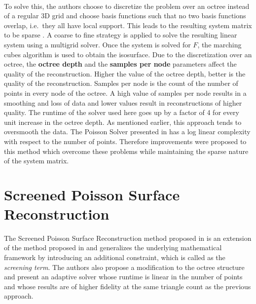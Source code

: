 \documentclass[12pt,a4paper]{article}
\begin{document}
\paragraph{}
To solve this, the authors choose to discretize the problem over an octree instead of a regular 3D grid and choose basis functions such that no two basis functions overlap, i.e.\ they all have local support. This leads to  the resulting system matrix to be sparse \cite{DBLP:journals/bioinformatics/KimVMSYLFMKRKHFT14}. A coarse to fine strategy is applied to solve the resulting linear system using a multigrid solver. Once the system is solved for $F$, the marching cubes algorithm \cite{MC} is used to obtain the isosurface. Due to the discretization over an octree, the \textbf{octree depth} and the \textbf{samples per node} parameters affect the quality of the reconstruction. Higher the value of the octree depth, better is the quality of the reconstruction. Samples per node is the count of the number of points in every node of the octree. A high value of samples per node results in a smoothing and loss of data and lower values result in reconstructions of higher quality. The runtime of the solver used here goes up by a factor of 4 for every unit increase in the octree depth. As mentioned earlier, this approach tends to oversmooth the data. The Poisson Solver presented in \cite{Poisson} has a log linear complexity with respect to the number of points. Therefore improvements were proposed to this method which overcome these problems while maintaining the sparse nature of the system matrix.

\section{Screened Poisson Surface Reconstruction} \label{sec:SPSR}
\paragraph{}The Screened Poisson Surface Reconstruction method proposed in \cite{ScreenedPoisson} is an extension of the method proposed in \cite{Poisson} and generalizes the underlying mathematical framework by introducing an additional constraint, which is called as the \textit{screening term}. The authors also propose a modification to the octree structure and present an adaptive solver whose runtime is linear in the number of points and whose results are of higher fidelity at the same triangle count as the previous approach.
\end{document}
